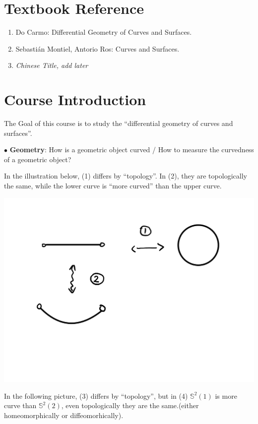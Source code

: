 \setlength{\headheight}{33.24858pt}
\section*{Textbook Reference}
\begin{enumerate}[(1)]
    \item Do Carmo: Differential Geometry of Curves and Surfaces.
    \item Sebasti\'an Montiel, Antorio Ros: Curves and Surfaces.
    \item \textit{Chinese Title, add later}
\end{enumerate}
\section*{Course Introduction}
The Goal of this course is to study the ``differential geometry of curves and surfaces''.

\noindent
$\bullet$ \textbf{Geometry}: How is a geometric object curved / How to measure the curvedness of a geometric object? 
\begin{example}
     In the illustration below, (1) differs by ``topology''. In (2), they are topologically the same, while the lower curve is ``more curved'' than the upper curve.
\end{example}

\begin{center}
    \includegraphics[scale=0.3]{picture/preface/preface_example1.png}
\end{center}

\begin{example}
    In the following picture, (3) differs by ``topology'', but in (4) $\mathbb{S}^2(1)$ is more curve than $\mathbb{S}^2(2)$, even topologically they are the same.(either homeomorphically or diffeomorhically).
\end{example}

